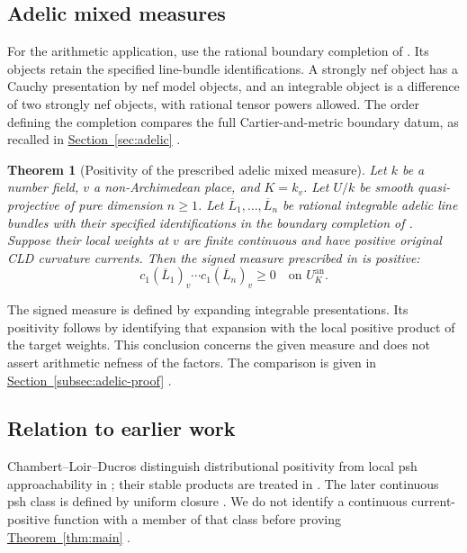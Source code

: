 \documentclass[11pt]{amsart}
\newtheorem{theorem}{Theorem}[section]
\theoremstyle{definition}
\theoremstyle{remark}
\numberwithin{equation}{section}
\newcommand{\an}{\mathrm{an}}
\newcommand{\namedref}[2]{%
 \begingroup
 \ifstrequal{#1}{Section}{\hypersetup{linkcolor=sectionteal}}{%
  \ifstrequal{#1}{Appendix}{\hypersetup{linkcolor=sectionteal}}{}}%
 \hyperref[#2]{#1~\ref*{#2}}%
 \endgroup}
\begin{document}
\subsection{Adelic mixed measures}
For the arithmetic application, use the rational boundary completion of
\cite[Sections 2.4--2.5]{YZ}. Its objects retain the specified
line-bundle identifications. A strongly nef object has a Cauchy
presentation by nef model objects, and an integrable object is a
difference of two strongly nef objects, with rational tensor powers
allowed. The order defining the completion compares the full
Cartier-and-metric boundary datum, as recalled in
\namedref{Section}{sec:adelic}.

\begin{theorem}[Positivity of the prescribed adelic mixed measure]
\label{thm:adelic}
Let \(k\) be a number field, \(v\) a non-Archimedean place, and \(K=k_v\).
Let \(U/k\) be smooth quasi-projective of pure dimension \(n\geq1\).
Let \(\overline L_1,\ldots,\overline L_n\) be rational integrable adelic
line bundles with their specified identifications in the boundary
completion of \cite[Sections 2.4--2.5]{YZ}. Suppose their local weights
at \(v\) are finite continuous and have positive original CLD curvature
currents. Then the signed measure prescribed in
\cite[Sections 3.6.7--3.6.8]{YZ} is positive:
\[
 c_1(\overline L_1)_v\cdots c_1(\overline L_n)_v\geq0
 \quad\text{on }U_K^\an.
\]
\end{theorem}

The signed measure is defined by expanding integrable presentations.
Its positivity follows by identifying that expansion with the local
positive product of the target weights. This conclusion concerns the
given measure and does not assert arithmetic nefness of the factors.
The comparison is given in \namedref{Section}{subsec:adelic-proof}.

\subsection{Relation to earlier work}
Chambert--Loir--Ducros distinguish distributional positivity from local
psh approachability in \cite[Definition 5.6.3 and Remark 5.6.4]{CLD12};
their stable products are treated in
\cite[Corollary 5.6.5 and Section 5.6.8]{CLD12}.
The later continuous psh class is defined by uniform closure
\cite[Definition 8.1.7]{CLD25}. We do not identify a continuous
current-positive function with a member of that class before proving
\namedref{Theorem}{thm:main}.
\end{document}

